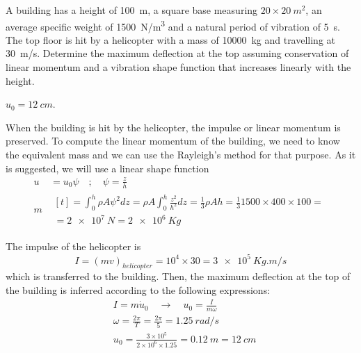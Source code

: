 
\begin{Exercise}[label={helicopter_impulse}]
A building has a height of \SI{100}{m}, a square base measuring $20\times\SI{20}{m^2}$, an average specific weight of \SI{1500}{N/m^3} and a natural period of vibration of \SI{5}{s}. The top floor is hit by a helicopter with a mass of \SI{10000}{kg} and travelling at \SI{30}{m/s}. Determine the maximum deflection at the top assuming conservation of linear momentum and a vibration shape function that increases linearly with the height.

\begin{center}
\end{center}

\shortAnswer $u_0 = \SI{12}{cm}$.
\end{Exercise}



\begin{Answer}[ref={helicopter_impulse}]
When the building is hit by the helicopter, the impulse or linear momentum is preserved. To compute the linear momentum of the building, we need to know the equivalent mass and we can use the Rayleigh's method for that purpose. As it is suggested, we will use a linear shape function
\begin{align*}
u& = u_0\psi \quad ; \quad \psi = \frac{z}{h} \\
m& \begin{multlined}[t]= \int_0^h \rho A\psi^2dz = \rho A\int_0^h\frac{z^2}{h^2}dz = \frac{1}{3}\rho Ah = \frac{1}{3} 1500 \times 400 \times 100 = \\
    = \SI{2e7}{N} = \SI{2e6}{Kg} \end{multlined}
\end{align*}

The impulse of the helicopter is
$$
I = (mv)_{helicopter} = 10^4 \times 30 = \SI{3e5}{Kg.m/s}
$$
which is transferred to the building. Then, the maximum deflection at the top of the building is inferred according to the following expressions:
\begin{align*}
&I = m\dot{u}_0 \quad \rightarrow \quad u_0 = \frac{I}{m\omega} \\
&\omega = \frac{2\pi}{T} = \frac{2\pi}{5} = \SI{1.25}{rad/s} \\
&u_0 = \frac{3\times 10^5}{2\times 10^6\times 1.25} = \SI{0.12}{m} = \SI{12}{cm}
\end{align*}
\end{Answer}

